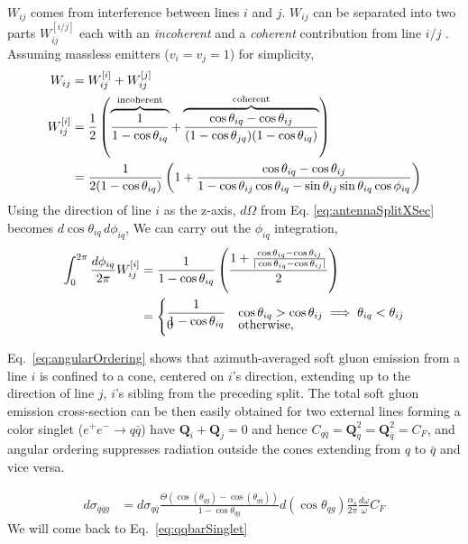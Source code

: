   \(W_{ij}\) comes from interference between lines \(i\) and \(j\). \(W_{ij}\) can be separated into two parts  \(W^{[i/j]}_{ij}\) each with an \emph{incoherent} and a \emph{coherent} contribution from line \(i/j\)  . Assuming massless emitters (\(v_i=v_j=1\)) for simplicity,
\begin{align}
	W_{ij} &= W^{[i]}_{ij} + W^{[j]}_{ij}\notag\\
	W^{[i]}_{ij} &= \frac{1}{2}\left(\overbrace{\frac{1}{1-\cos\theta_{iq}}}^\mathrm{incoherent} + \overbrace{\frac{\cos\theta_{iq}-\cos\theta_{ij}}{(1-\cos\theta_{jq}) (1-\cos\theta_{iq})}}^\mathrm{coherent}\right)\notag\\
	&=  \frac{1}{2(1-\cos\theta_{iq})}\left(1 + \frac{\cos\theta_{iq}-\cos\theta_{ij}}{1-\cos\theta_{ij}\cos\theta_{iq} - \sin\theta_{ij}\sin\theta_{iq}\cos\phi_{iq}}\right)
	\label{eq:antennaSplit}
\end{align}
Using the direction of line \(i\) as the z-axis, \(d\Omega \)  from Eq. \ref{eq:antennaSplitXSec} becomes \(d\cos\theta_{iq}\,d\phi_{iq}\), We can carry out the \(\phi_{iq}\) integration,
\begin{align}
	\int_0^{2\pi}\frac{d\phi_{iq}}{2\pi}W^{[i]}_{ij} &= \frac{1}{1-\cos\theta_{iq}}\left(\frac{1 + \frac{\cos\theta_{iq}-\cos\theta_{ij}}{|\cos\theta_{iq}-\cos\theta_{ij}|}}{2}\right) \notag\\
	&= \begin{cases}
		\dfrac{1}{1-\cos\theta_{iq}} & \cos\theta_{iq} > \cos\theta_{ij} \implies \theta_{iq} < \theta_{ij}\\[-10pt]
		0 & \text{otherwise,}
	\end{cases}
	\label{eq:angularOrdering}
\end{align}

Eq.~\ref{eq:angularOrdering}  shows that azimuth-averaged soft gluon emission from a line \(i\) is confined to a cone, centered on \(i\)'s direction, extending up to the direction of line \(j\), \(i\)'s sibling from the preceding split. The total soft gluon emission cross-section can be then easily obtained for two external lines forming a color singlet (\(e^+e^-\to q\bar{q}\)) have \(\mathbf{Q}_i+\mathbf{Q}_j=0\) and hence \(C_{q\bar{q}}=\mathbf{Q}_q^2=\mathbf{Q}_{\bar{q}}^2 = C_F\), and angular ordering suppresses radiation outside the cones extending from \(q\) to \(\bar{q}\) and vice versa.

\begin{align}
	d\sigma_{q\bar{q}g}& = d\sigma_{q\bar{q}}\frac{\Theta(\cos(\theta_{qg})-\cos(\theta_{q\bar{q}}))}{1-\cos\theta_{qg}}d(\cos\theta_{qg})\frac{\alpha_s}{2\pi}\frac{d\omega}{\omega}C_F
	\label{eq:qqbarSinglet}
\end{align}
We will come back to Eq.~\ref{eq:qqbarSinglet} 

